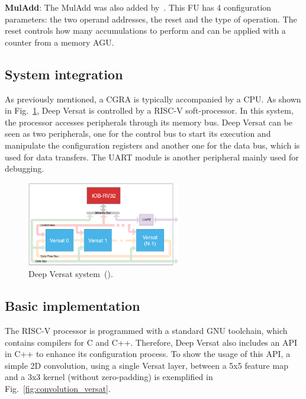 \vspace{-0.4cm} \textbf{MulAdd}: The MulAdd was also added by~\cite{valter:deep_versat}. This FU has 4 configuration parameters: the two operand addresses, the reset and the type of operation. The reset controls how many accumulations to perform and can be applied with a counter from a memory AGU.  


\subsection{System integration}

As previously mentioned, a CGRA is typically accompanied by a CPU. As shown in Fig.~\ref{fig:deep_versat_system}, Deep Versat is controlled by a RISC-V soft-processor. In this system, the processor accesses peripherals through its memory bus. Deep Versat can be seen as two peripherals, one for the control bus to start its execution and manipulate the configuration registers and another one for the data bus, which is used for data transfers. The UART module is another peripheral mainly used for debugging.

\begin{figure}[!htb]
  \centering
  \includegraphics[width=0.6\textwidth]{Figures/deep_versat_system.png}
  \caption{Deep Versat system~(\cite{valter:deep_versat}).}
  \label{fig:deep_versat_system}
\end{figure}

\subsection{Basic implementation}

The RISC-V processor is programmed with a standard GNU toolchain, which contains compilers for C and C++. Therefore, Deep Versat also includes an API in C++ to enhance its configuration process. To show the usage of this API, a simple 2D convolution, using a single Versat layer, between a 5x5 feature map and a 3x3 kernel (without zero-padding) is exemplified in Fig.~\ref{fig:convolution_versat}. 

